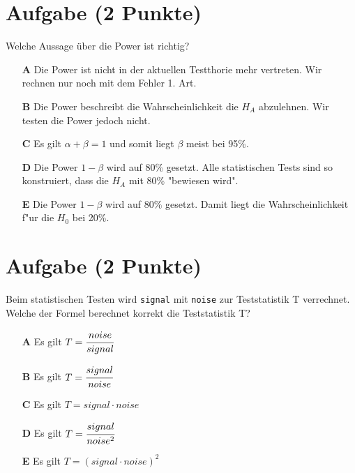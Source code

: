 \documentclass[a4paper, 10pt]{scrartcl}\usepackage[]{graphicx}\usepackage[]{xcolor}
\begin{document}
\section{Aufgabe \hfill (2 Punkte)}

Welche Aussage {\"u}ber die Power ist richtig?



\begin{enumerate}
\item [\textbf{A} \msquare] Die Power ist nicht in der aktuellen Testthorie mehr vertreten. Wir rechnen nur noch mit dem Fehler 1. Art.
\item [\textbf{B} \msquare] Die Power beschreibt die Wahrscheinlichkeit die $H_A$ abzulehnen. Wir testen die Power jedoch nicht.
\item [\textbf{C} \msquare] Es gilt $\alpha + \beta = 1$ und somit liegt $\beta$ meist bei 95\%.
\item [\textbf{D} \msquare] Die Power $1-\beta$ wird auf 80\% gesetzt. Alle statistischen Tests sind so konstruiert, dass die $H_A$ mit 80\% "bewiesen wird".
\item [\textbf{E} \msquare] Die Power $1-\beta$ wird auf 80\% gesetzt. Damit liegt die Wahrscheinlichkeit f{"u}r die $H_0$ bei 20\%.
\end{enumerate}

\section{Aufgabe \hfill (2 Punkte)}

Beim statistischen Testen wird \texttt{signal} mit \texttt{noise} zur
Teststatistik T verrechnet. Welche der Formel berechnet korrekt die
Teststatistik T?



\begin{enumerate}
\item [\textbf{A} \msquare] Es gilt $T = \cfrac{noise}{signal}$
\item [\textbf{B} \msquare] Es gilt $T = \cfrac{signal}{noise}$
\item [\textbf{C} \msquare] Es gilt $T = signal \cdot noise$
\item [\textbf{D} \msquare] Es gilt $T = \cfrac{signal}{noise^2}$
\item [\textbf{E} \msquare] Es gilt $T = (signal \cdot noise)^2$
\end{enumerate}

\end{document}

